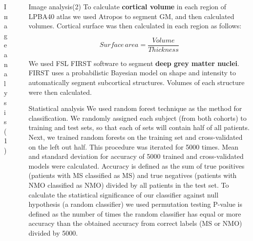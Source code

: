 \documentclass[final]{beamer}
\newlength{\sepwid}
\newlength{\onecolwid}
\newlength{\twocolwid}
\begin{document}
\begin{frame}[t]
\begin{columns}[t]
\begin{column}{\onecolwid}
\begin{block}{Image analysis(1)}
\end{block}



\end{column} %

\begin{column}{\sepwid}\end{column} %

\begin{column}{\twocolwid} %

\begin{columns}[t,totalwidth=\twocolwid] %

\begin{column}{\onecolwid}\vspace{-.6in} %


\begin{block}{Image analysis(2)}
To calculate \textbf{cortical volume} in each region of LPBA40 atlas we used Atropos to segment GM, and then calculated volumes. Cortical surface was then calculated in each region as follows:
  
\begin{equation}
Surface\,area = \frac{Volume}{Thickness}
\label{eqn:SurfaceEqn}
\end{equation}

We used FSL FIRST software to segment \textbf{deep grey matter nuclei}. FIRST uses a probabilistic Bayesian model on shape and 
intensity to automatically segment subcortical structures. Volumes of each structure were then calculated.
\end{block}

\begin{block}{Statistical analysis}
We used random forest technique as the method for classification. 
We randomly assigned each subject (from both cohorts) to training and test sets, 
so that each of sets will contain half of all patients. Next, we trained random forests 
on the training set and cross-validated on the left out half. This procedure was 
iterated for 5000 times. Mean and standard deviation for accuracy of 5000 trained 
and cross-validated models were calculated. Accuracy is defined as the sum of true 
positives (patients with MS classified as MS) and true negatives (patients with NMO 
classified as NMO) divided by all patients in the test set. To calculate the statistical 
significance of our classifier against null hypothesis (a random classifier) we used 
permutation testing P-value is defined 
as the number of times the random classifier has equal or more accuracy than the 
obtained accuracy from correct labels (MS or NMO) divided by 5000.


\end{block}
\end{column}
\end{columns}
\end{column}
\end{columns}
\end{frame}
\end{document}
